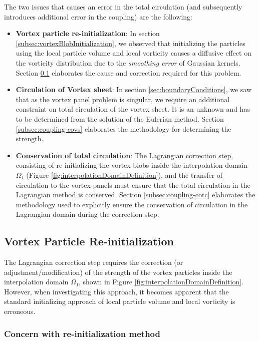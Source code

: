 The two issues that causes an error in the total circulation (and subsequently introduces additional error in the coupling) are the following:
	\begin{itemize}
	\item \textbf{Vortex particle re-initialization}: In section \ref{subsec:vortexBlobInitialization}, we observed that initializing the particles using the local particle volume and local vorticity causes a diffusive effect on the vorticity distribution due to the \textit{smoothing error} of Gaussian kernels. Section 	\ref{subsec:coupling-vpri} elaborates the cause and correction required for this problem.
	
	\item \textbf{Circulation of Vortex sheet}: In section \ref{sec:boundaryConditions}, we saw that as the vortex panel problem is singular, we require an additional constraint on total circulation of the vortex sheet. It is an unknown and has to be determined from the solution of the Eulerian method. Section \ref{subsec:coupling-covs} elaborates the methodology for determining the strength.
	\item \textbf{Conservation of total circulation}: The Lagrangian correction step, consisting of re-initializing the vortex blobs inside the interpolation domain $\Omega_I$ (Figure \ref{fig:interpolationDomainDefinition}), and the transfer of circulation to the vortex panels must ensure that the total circulation in the Lagrangian method is conserved. Section \ref{subsec:coupling-cotc} elaborates the methodology used to explicitly ensure the conservation of circulation in the Lagrangian domain during the correction step.
	\end{itemize}

	\subsection{Vortex Particle Re-initialization}
	\label{subsec:coupling-vpri}
	
	The Lagrangian correction step requires the correction (or adjustment/modification) of the strength of the vortex particles inside the interpolation domain $\Omega_{I}$, shown in Figure \ref{fig:interpolationDomainDefinition}.
	However, when investigating this approach, it becomes apparent that the standard initializing approach of local particle volume and local vorticity is erroneous.
		
	\subsubsection*{Concern with re-initialization method}

